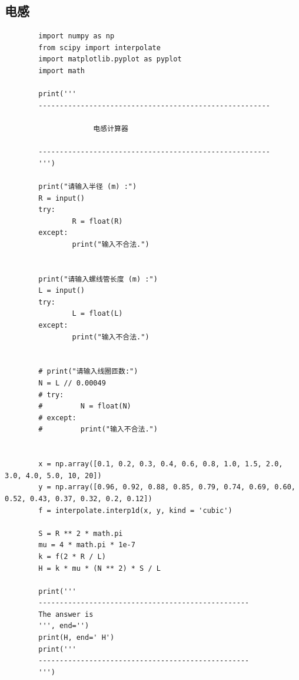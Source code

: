 \documentclass[conference]{IEEEtran}
\theoremstyle{break}
\begin{document}
\subsection{电感}
\begin{lstlisting}
        import numpy as np
        from scipy import interpolate
        import matplotlib.pyplot as pyplot
        import math
        
        print('''
        -------------------------------------------------------
        
                     电感计算器
        
        -------------------------------------------------------
        ''')
        
        print("请输入半径 (m) :")
        R = input()
        try:
                R = float(R)
        except:
                print("输入不合法.")
        
        
        print("请输入螺线管长度 (m) :")
        L = input()
        try:
                L = float(L)
        except:
                print("输入不合法.")
        
        
        # print("请输入线圈匝数:")
        N = L // 0.00049
        # try:
        #         N = float(N)
        # except:
        #         print("输入不合法.")
        
        
        x = np.array([0.1, 0.2, 0.3, 0.4, 0.6, 0.8, 1.0, 1.5, 2.0, 3.0, 4.0, 5.0, 10, 20])
        y = np.array([0.96, 0.92, 0.88, 0.85, 0.79, 0.74, 0.69, 0.60, 0.52, 0.43, 0.37, 0.32, 0.2, 0.12])
        f = interpolate.interp1d(x, y, kind = 'cubic')
        
        S = R ** 2 * math.pi
        mu = 4 * math.pi * 1e-7
        k = f(2 * R / L)
        H = k * mu * (N ** 2) * S / L
        
        print('''
        --------------------------------------------------
        The answer is 
        ''', end='')
        print(H, end=' H')
        print('''
        --------------------------------------------------
        ''')                                            
        
        
        
\end{lstlisting} 
\end{document}
